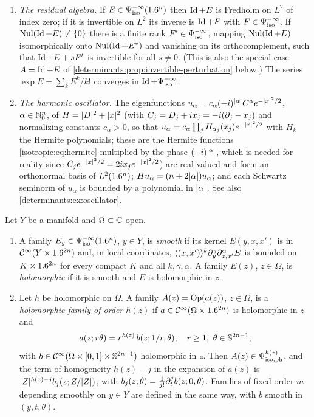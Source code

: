 \begin{enumerate}[label=(I\arabic*)]
  invertible on $L^2$.
\item\label{determinants:I:residual} \emph{The residual algebra.} If
  $E\in\Psi^{-\infty}_{\mathrm{iso}}(1.6^n)$ then $\operatorname{Id}+E$ is Fredholm on $L^2$ of index
  zero; if it is invertible on $L^2$ its inverse is $\operatorname{Id}+F$ with
  $F\in\Psi^{-\infty}_{\mathrm{iso}}$. If $\operatorname{Nul}(\operatorname{Id}+E)\ne\{0\}$ there is a finite rank
  $F'\in\Psi^{-\infty}_{\mathrm{iso}}$, mapping $\operatorname{Nul}(\operatorname{Id}+E)$ isomorphically onto
  $\operatorname{Nul}(\operatorname{Id}+E^*)$ and vanishing on its orthocomplement, such that $\operatorname{Id}+E+sF'$
  is invertible for all $s\ne0$. (This is also the special case
  $A=\operatorname{Id}+E$ of \cref{determinants:prop:invertible-perturbation} below.) The
  series $\exp E=\sum_k E^k/k!$ converges in $\operatorname{Id}+\Psi^{-\infty}_{\mathrm{iso}}$.
\item\label{determinants:I:oscillator} \emph{The harmonic oscillator.} The
  eigenfunctions $u_\alpha=c_\alpha(-i)^{\lvert \alpha\rvert}C^\alpha e^{-\lvert x\rvert^2/2}$,
  $\alpha\in\mathbb{N}_0^n$, of $H=\lvert D\rvert^2+\lvert x\rvert^2$ (with $C_j=D_j+ix_j=-i(\partial_j-x_j)$
  and normalizing constants $c_\alpha>0$, so that
  $u_\alpha=c_\alpha\prod_jH_{\alpha_j}(x_j)e^{-\lvert x\rvert^2/2}$ with $H_k$ the
  Hermite polynomials; these are the Hermite functions
  \eqref{isotropic:eq:hermite} multiplied by the phase $(-i)^{\lvert \alpha\rvert}$,
  which is needed for reality since
  $C_je^{-\lvert x\rvert^2/2}=2ix_je^{-\lvert x\rvert^2/2}$) are real-valued and form an orthonormal
  basis of $L^2(1.6^n)$; $Hu_\alpha=(n+2\lvert \alpha\rvert)u_\alpha$; and each Schwartz
  seminorm of $u_\alpha$ is bounded by a polynomial in $\lvert \alpha\rvert$. See
  also \cref{determinants:ex:oscillator}.
\end{enumerate}

\begin{definition}\label{determinants:def:families}
  Let $Y$ be a manifold and $\Omega\subset\mathbb{C}$ open.
  \begin{enumerate}[label=(\alph*)]
  \item A family $E_y\in\Psi^{-\infty}_{\mathrm{iso}}(1.6^n)$, $y\in Y$, is \emph{smooth}
    if its kernel $E(y,x,x')$ is in $\mathcal{C}^\infty(Y\times1.6^{2n})$ and, in local
    coordinates, $\langle (x,x')\rangle^k\partial_y^\gamma\partial_{x,x'}^\alpha E$ is bounded on
    $K\times1.6^{2n}$ for every compact $K$ and all $k,\gamma,\alpha$. A family
    $E(z)$, $z\in\Omega$, is \emph{holomorphic} if it is smooth and $E$ is
    holomorphic in $z$.
  \item Let $h$ be holomorphic on $\Omega$. A family $A(z)=\operatorname{Op}(a(z))$,
    $z\in\Omega$, is a \emph{holomorphic family of order $h(z)$} if $a\in\mathcal{C}^\infty(\Omega\times1.6^{2n})$ is holomorphic in $z$ and
    \begin{equation}\label{determinants:eq:hol-family}
      a(z;r\theta)=r^{h(z)}\,b(z;1/r,\theta),\quad r\ge1,\ \theta\in\Sphere^{2n-1},
    \end{equation}
    with $b\in\mathcal{C}^\infty(\Omega\times[0,1]\times\mathbb{S}^{2n-1})$ holomorphic in $z$.
    Then $A(z)\in\Psi^{h(z)}_{\mathrm{iso,ph}}$, and the term of homogeneity $h(z)-j$ in the
    expansion of $a(z)$ is $\lvert Z\rvert^{h(z)-j}b_j(z;Z/\lvert Z\rvert)$, with
    $b_j(z;\theta)=\frac1{j!}\partial_t^jb(z;0,\theta)$. Families of fixed order
    $m$ depending smoothly on $y\in Y$ are defined in the same way, with $b$
    smooth in $(y,t,\theta)$.
  \end{enumerate}
\end{definition}

